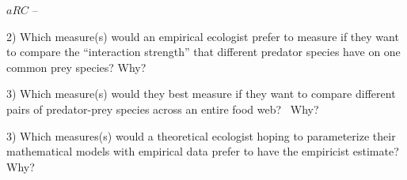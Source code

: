 \documentclass{article}
\begin{document}
$aRC$ --
\vspace{1.5 cm}


2) Which measure(s) would an empirical ecologist prefer to measure if they want to compare the ``interaction strength'' that different predator species have on one common prey species?  Why?

\vspace{3 cm}


3) Which measure(s) would they best measure if they want to compare different pairs of predator-prey species across an entire food web?  Why?

\vspace{3 cm}


3) Which measures(s) would a theoretical ecologist hoping to parameterize their mathematical models with empirical data prefer to have the empiricist estimate?  Why?

\vspace{3 cm}
\end{document}
